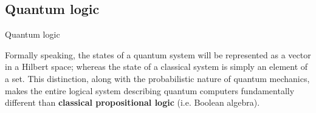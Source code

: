 \documentclass[9pt, handout, aspectratio=169]{beamer}	%
\begin{document}

\subsection{Quantum logic}

\begin{frame}{Quantum logic}

	Formally speaking, the states of a quantum system will be represented as a vector in a Hilbert space; whereas the state of a classical system is simply an element of a set. This distinction, along with the probabilistic nature of quantum mechanics, makes the entire logical system describing quantum computers fundamentally different than \textbf{classical propositional logic} (i.e. Boolean algebra).


	\begin{multicols}{2}


		\columnbreak


	\end{multicols}

\end{frame}
\end{document}
